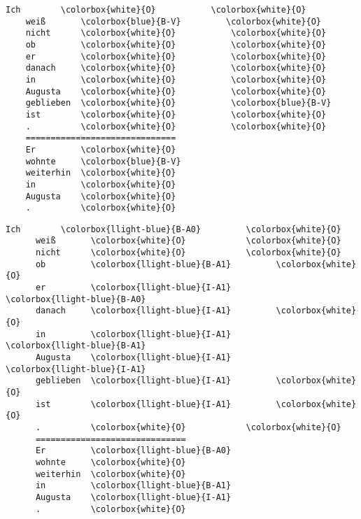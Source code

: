 \begingroup
\begin{srl}[!h]
\centering
  \begin{minipage}{0.45\linewidth}
  \vspace{0pt}
    \begin{BVerbatim}[commandchars=\\\{\}, fontsize=\footnotesize]
    Ich        \colorbox{white}{O}           \colorbox{white}{O}
    weiß       \colorbox{blue}{B-V}         \colorbox{white}{O}
    nicht      \colorbox{white}{O}           \colorbox{white}{O}
    ob         \colorbox{white}{O}           \colorbox{white}{O}
    er         \colorbox{white}{O}           \colorbox{white}{O}
    danach     \colorbox{white}{O}           \colorbox{white}{O}
    in         \colorbox{white}{O}           \colorbox{white}{O}
    Augusta    \colorbox{white}{O}           \colorbox{white}{O}
    geblieben  \colorbox{white}{O}           \colorbox{blue}{B-V}
    ist        \colorbox{white}{O}           \colorbox{white}{O}
    .          \colorbox{white}{O}           \colorbox{white}{O}
    ==============================
    Er         \colorbox{white}{O}
    wohnte     \colorbox{blue}{B-V}
    weiterhin  \colorbox{white}{O}
    in         \colorbox{white}{O}
    Augusta    \colorbox{white}{O}
    .          \colorbox{white}{O}
    \end{BVerbatim}
  \end{minipage}
  \hfill
  \begin{minipage}{0.45\linewidth}
  \vspace{0pt}
    \begin{BVerbatim}[commandchars=\\\{\}, fontsize=\footnotesize]
      Ich        \colorbox{llight-blue}{B-A0}         \colorbox{white}{O}
      weiß       \colorbox{white}{O}            \colorbox{white}{O}
      nicht      \colorbox{white}{O}            \colorbox{white}{O}
      ob         \colorbox{llight-blue}{B-A1}         \colorbox{white}{O}
      er         \colorbox{llight-blue}{I-A1}         \colorbox{llight-blue}{B-A0}
      danach     \colorbox{llight-blue}{I-A1}         \colorbox{white}{O}
      in         \colorbox{llight-blue}{I-A1}         \colorbox{llight-blue}{B-A1}
      Augusta    \colorbox{llight-blue}{I-A1}         \colorbox{llight-blue}{I-A1}
      geblieben  \colorbox{llight-blue}{I-A1}         \colorbox{white}{O}
      ist        \colorbox{llight-blue}{I-A1}         \colorbox{white}{O}
      .          \colorbox{white}{O}            \colorbox{white}{O}
      ==============================
      Er         \colorbox{llight-blue}{B-A0}
      wohnte     \colorbox{white}{O}
      weiterhin  \colorbox{white}{O}
      in         \colorbox{llight-blue}{B-A1}
      Augusta    \colorbox{llight-blue}{I-A1}
      .          \colorbox{white}{O}
    \end{BVerbatim}
  \end{minipage}
\end{srl}
\endgroup



